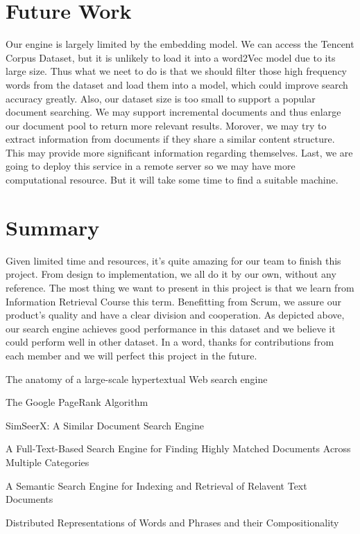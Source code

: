 \documentclass{article}
\begin{document}
\section{Future Work}
Our engine is largely limited by the embedding model. We can access the Tencent Corpus Dataset, but it is unlikely to load it into a word2Vec model due to its large size. Thus what we neet to do is that we should filter those high frequency words from the dataset and load them into a model, which could improve search accuracy greatly.
Also, our dataset size is too small to support a popular document searching. We may support incremental documents and thus enlarge our document pool to return more relevant results.
Morover, we may try to extract information from documents if they share a similar content structure. This may provide more significant information regarding themselves.
Last, we are going to deploy this service in a remote server so we may have more computational resource. But it will take some time to find a suitable machine.

\section{Summary}
Given limited time and resources, it's quite amazing for our team to finish this project. From design to implementation, we all do it by our own, without any reference. The most thing we want to present in this project is that we learn from Information Retrieval Course this term. Benefitting from Scrum, we assure our product's quality and have a clear division and cooperation. As depicted above, our search engine achieves good performance in this dataset and we believe it could perform well in other dataset.
In a word, thanks for contributions from each member and we will perfect this project in the future.


  
\begin{thebibliography}{1}
The anatomy of a large-scale hypertextual Web search engine


The Google PageRank Algorithm


SimSeerX: A Similar Document Search Engine


A Full-Text-Based Search Engine for Finding Highly Matched Documents Across Multiple Categories

A Semantic Search Engine for Indexing and Retrieval of Relavent Text Documents

Distributed Representations of Words and Phrases and their Compositionality


\end{thebibliography}
\end{document}

